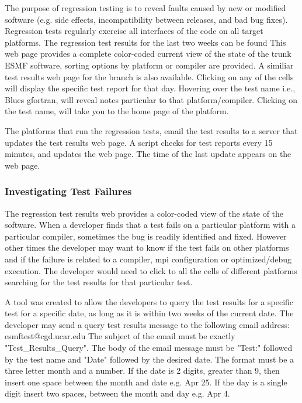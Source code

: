 The purpose of regression testing is to reveal faults caused by new
or modified software (e.g. side effects, incompatibility between 
releases, and bad bug fixes).  
Regression tests regularly exercise all interfaces of the code on 
all target platforms.  
The regression test results for the last two weeks can be found 
This web page provides a complete color-coded current view of the state of the trunk ESMF software, sorting options by platform or compiler are provided.
A similiar test results web page for the branch is also available.
Clicking on any of the cells will display the specific test report for that day.
Hovering over the test name i.e., Blues gfortran, will reveal notes particular to that platform/compiler. Clicking on the test name, will take you to the home page of the platform. 

The platforms that run the regression tests, email the test results to a server that updates the test results web page. A script checks for test reports every 15 minutes, and updates the web page. The time of the last update appears on the web page.

\subsubsection{Investigating Test Failures}
The regression test results web
 provides a color-coded view of the state of the software.
When a developer finds that a test fails on a particular platform with a particular compiler, sometimes the bug is readily identified and fixed.
However other times the developer may want to know if the test fails on other platforms and if the failure is related to a compiler, mpi configuration or optimized/debug execution.
The developer would need to click to all the cells of different platforms searching for the test results for that particular test.

A tool was created to allow the developers to query the test results for a specific test for a specific date, as long as it is within two weeks of the current date.
The developer may send a query test results message to the following email address: esmftest@cgd.ucar.edu
The subject of the email must be exactly "Test\_Results\_Query". The body of the email message must be "Test:" followed by the test name and "Date" followed by the desired date. The format must be a three letter month and a number. If the date is 2 digits, greater than 9, then insert one space between the month and date e.g. Apr 25. If the day is a single digit insert two spaces, between the month and day e.g. Apr  4.

